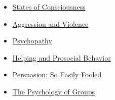 \documentclass[
]{article}
\begin{document}
\begin{itemize}
\item
  \href{http://nobaproject.com/modules/states-of-consciousness}{States of Consciousness}
\item
  \href{http://nobaproject.com/modules/aggression-and-violence}{Aggression and Violence}
\item
  \href{http://nobaproject.com/modules/psychopathy}{Psychopathy}
\item
  \href{http://nobaproject.com/modules/helping-and-prosocial-behavior}{Helping and Prosocial Behavior}
\item
  \href{http://nobaproject.com/modules/persuasion-so-easily-fooled}{Persuasion: So Easily Fooled}
\item
  \href{http://nobaproject.com/modules/the-psychology-of-groups}{The Psychology of Groups}
\end{itemize}
\end{document}
